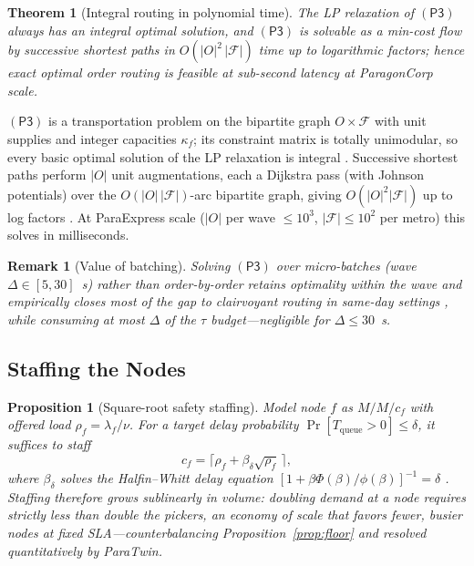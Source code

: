 \documentclass[journal]{IEEEtran}
\newtheorem{theorem}{Theorem}
\newtheorem{proposition}{Proposition}
\newtheorem{remark}{Remark}
\begin{document}
\begin{theorem}[Integral routing in polynomial time]
\label{thm:routing}
The LP relaxation of $(\mathsf{P3})$ always has an integral optimal solution, and $(\mathsf{P3})$ is solvable as a min-cost flow by successive shortest paths in $O(|O|^{2}\,|\mathcal{F}|)$ time up to logarithmic factors; hence exact optimal order routing is feasible at sub-second latency at ParagonCorp scale.
\end{theorem}
\begin{IEEEproof}
$(\mathsf{P3})$ is a transportation problem on the bipartite graph $O \times \mathcal{F}$ with unit supplies and integer capacities $\kappa_f$; its constraint matrix is totally unimodular, so every basic optimal solution of the LP relaxation is integral \cite{ahuja}. Successive shortest paths perform $|O|$ unit augmentations, each a Dijkstra pass (with Johnson potentials) over the $O(|O|\,|\mathcal{F}|)$-arc bipartite graph, giving $O(|O|^{2}|\mathcal{F}|)$ up to log factors \cite{ahuja}. At ParaExpress scale ($|O|$ per wave $\le 10^3$, $|\mathcal{F}| \le 10^2$ per metro) this solves in milliseconds.
\end{IEEEproof}

\begin{remark}[Value of batching]
\label{rem:batching}
Solving $(\mathsf{P3})$ over micro-batches (wave $\Delta \in [5,30]$~s) rather than order-by-order retains optimality within the wave and empirically closes most of the gap to clairvoyant routing in same-day settings \cite{klapp,ulmer}, while consuming at most $\Delta$ of the $\tau$ budget---negligible for $\Delta \le 30$~s.
\end{remark}

\subsection{Staffing the Nodes}

\begin{proposition}[Square-root safety staffing]
\label{prop:staffing}
Model node $f$ as $M/M/c_f$ with offered load $\rho_f = \lambda_f / \nu$. For a target delay probability $\Pr[T_{\mathrm{queue}} > 0] \le \delta$, it suffices to staff
\begin{equation}
\label{eq:staff}
c_f = \big\lceil \rho_f + \beta_\delta \sqrt{\rho_f}\,\big\rceil,
\end{equation}
where $\beta_\delta$ solves the Halfin--Whitt delay equation $[1 + \beta \Phi(\beta)/\phi(\beta)]^{-1} = \delta$ \cite{halfin}. Staffing therefore grows \emph{sublinearly} in volume: doubling demand at a node requires strictly less than double the pickers, an economy of scale that favors fewer, busier nodes at fixed SLA---counterbalancing Proposition~\ref{prop:floor} and resolved quantitatively by ParaTwin.
\end{proposition}
\end{document}
